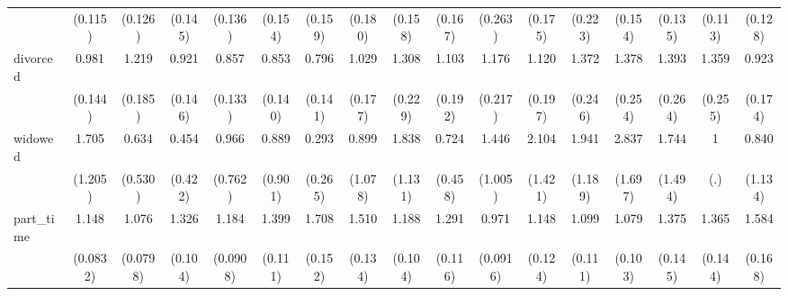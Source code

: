 {\begin{tabular}{l*{16}{c}}
                    &     (0.115)         &     (0.126)         &     (0.145)         &     (0.136)         &     (0.154)         &     (0.159)         &     (0.180)         &     (0.158)         &     (0.167)         &     (0.263)         &     (0.175)         &     (0.223)         &     (0.154)         &     (0.135)         &     (0.113)         &     (0.128)         \\
[1em]
divorced            &       0.981         &       1.219         &       0.921         &       0.857         &       0.853         &       0.796         &       1.029         &       1.308         &       1.103         &       1.176         &       1.120         &       1.372         &       1.378         &       1.393         &       1.359         &       0.923         \\
                    &     (0.144)         &     (0.185)         &     (0.146)         &     (0.133)         &     (0.140)         &     (0.141)         &     (0.177)         &     (0.229)         &     (0.192)         &     (0.217)         &     (0.197)         &     (0.246)         &     (0.254)         &     (0.264)         &     (0.255)         &     (0.174)         \\
[1em]
widowed             &       1.705         &       0.634         &       0.454         &       0.966         &       0.889         &       0.293         &       0.899         &       1.838         &       0.724         &       1.446         &       2.104         &       1.941         &       2.837         &       1.744         &           1         &       0.840         \\
                    &     (1.205)         &     (0.530)         &     (0.422)         &     (0.762)         &     (0.901)         &     (0.265)         &     (1.078)         &     (1.131)         &     (0.458)         &     (1.005)         &     (1.421)         &     (1.189)         &     (1.697)         &     (1.494)         &         (.)         &     (1.134)         \\
[1em]
part\_time           &       1.148         &       1.076         &       1.326\sym{***}&       1.184\sym{*}  &       1.399\sym{***}&       1.708\sym{***}&       1.510\sym{***}&       1.188\sym{*}  &       1.291\sym{**} &       0.971         &       1.148         &       1.099         &       1.079         &       1.375\sym{**} &       1.365\sym{**} &       1.584\sym{***}\\
                    &    (0.0832)         &    (0.0798)         &     (0.104)         &    (0.0908)         &     (0.111)         &     (0.152)         &     (0.134)         &     (0.104)         &     (0.116)         &    (0.0916)         &     (0.124)         &     (0.111)         &     (0.103)         &     (0.145)         &     (0.144)         &     (0.168)         \\

\end{tabular}}
